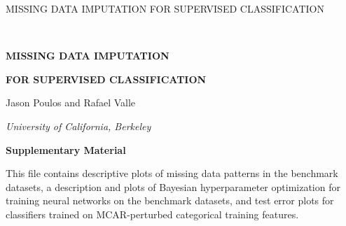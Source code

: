 \documentclass[10pt]{book}
\theoremstyle{definition}
\begin{document}

\renewcommand{\baselinestretch}{2}


{\hfill {\footnotesize\rm MISSING DATA IMPUTATION FOR SUPERVISED CLASSIFICATION} \hfill}

\renewcommand{\thefootnote}{}
$\ $\par \fontsize{12}{14pt plus.8pt minus .6pt}\selectfont


 \centerline{\large\bf MISSING DATA IMPUTATION }
\vspace{2pt}
 \centerline{\large\bf FOR SUPERVISED CLASSIFICATION}
\vspace{.25cm}
 \centerline{Jason Poulos and Rafael Valle} \vspace{.4cm} 
\vspace{.4cm}
 \centerline{\it University of California, Berkeley}
\vspace{.55cm}
 \centerline{\bf Supplementary Material}
\vspace{.55cm}
\fontsize{9}{11.5pt plus.8pt minus .6pt}\selectfont
\noindent
This file contains descriptive plots of missing data patterns in the benchmark datasets, a description and plots of Bayesian hyperparameter optimization for training neural networks on the benchmark datasets, and test error plots for classifiers trained on MCAR-perturbed categorical training features. 
\par

\setcounter{section}{0}
\setcounter{equation}{0}
\def\theequation{S\arabic{section}.\arabic{equation}}
\def\thesection{S\arabic{section}}

\fontsize{12}{14pt plus.8pt minus .6pt}\selectfont
\end{document}

